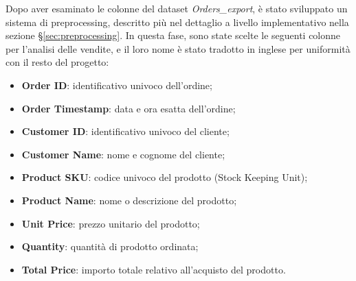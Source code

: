 Dopo aver esaminato le colonne del dataset \emph{Orders\_export}, è stato sviluppato un sistema di preprocessing, descritto più nel dettaglio a livello implementativo nella sezione \S\ref{sec:preprocessing}. In questa fase, sono state scelte le seguenti colonne per l'analisi delle vendite, e il loro nome è stato tradotto in inglese per uniformità con il resto del progetto:
\begin{itemize}
    \item \textbf{Order ID}: identificativo univoco dell'ordine;
    \item \textbf{Order Timestamp}: data e ora esatta dell'ordine;
    \item \textbf{Customer ID}: identificativo univoco del cliente;
    \item \textbf{Customer Name}: nome e cognome del cliente;
    \item \textbf{Product SKU}: codice univoco del prodotto (Stock Keeping Unit);
    \item \textbf{Product Name}: nome o descrizione del prodotto;
    \item \textbf{Unit Price}: prezzo unitario del prodotto;
    \item \textbf{Quantity}: quantità di prodotto ordinata;
    \item \textbf{Total Price}: importo totale relativo all'acquisto del prodotto.
\end{itemize}

